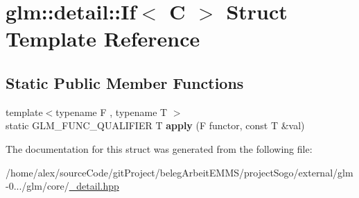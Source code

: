 \hypertarget{structglm_1_1detail_1_1If}{\section{glm\-:\-:detail\-:\-:If$<$ C $>$ Struct Template Reference}
\label{structglm_1_1detail_1_1If}
}
\subsection*{Static Public Member Functions}
\begin{DoxyCompactItemize}
\item 
\hypertarget{structglm_1_1detail_1_1If_ab66c77bac87f7ffe4aa6bb761b165746}{{\footnotesize template$<$typename F , typename T $>$ }\\static G\-L\-M\-\_\-\-F\-U\-N\-C\-\_\-\-Q\-U\-A\-L\-I\-F\-I\-E\-R T {\bfseries apply} (F functor, const T \&val)}\label{structglm_1_1detail_1_1If_ab66c77bac87f7ffe4aa6bb761b165746}

\end{DoxyCompactItemize}


The documentation for this struct was generated from the following file\-:\begin{DoxyCompactItemize}
\item 
/home/alex/source\-Code/git\-Project/beleg\-Arbeit\-E\-M\-M\-S/project\-Sogo/external/glm-\/0.../glm/core/\hyperlink{__detail_8hpp}{\-\_\-detail.\-hpp}\end{DoxyCompactItemize}
